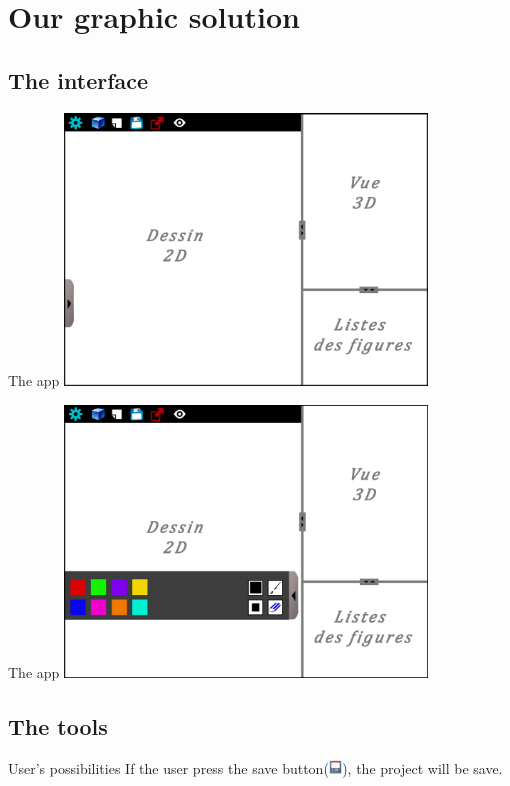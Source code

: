 \documentclass[a4paper,10pt]{beamer}
\begin{document}
	\section{Our graphic solution}
		
		\subsection{The interface}
		
			\begin{frame}{The app}
				\includegraphics[height=205pt]{images/AppliMenuFerme.png}
			\end{frame}
			
			\begin{frame}{The app}
				\includegraphics[height=205pt]{images/AppliMenuOuvert.png}
			\end{frame}
			
		\subsection{The tools}
		
			\begin{frame}{User's possibilities}
				If the user press the save button(\includegraphics[height=10pt]{images/saveIcone.png}), the project will be save.
			\end{frame}
	
\end{document}
